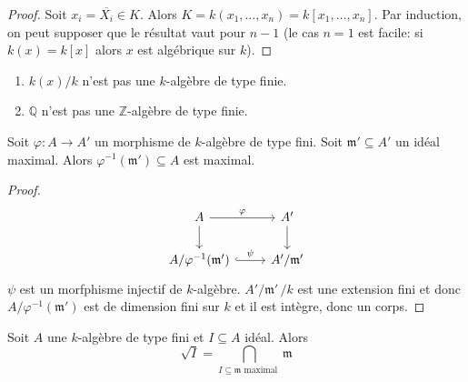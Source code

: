 \begin{proof}{}
    Soit \(x_{i} = \overline{X_{i}} \in K\). Alors \(K = k{(x_{1}, \dots,
    x_{n})} = k[x_{1}, \dots, x_{n}]\). Par induction, on peut supposer que le
    résultat vaut pour \(n-1\) (le cas \(n=1\) est facile: si \(k{(x)} = k[x]\)
    alors \(x\) est algébrique sur \(k\)). %
\end{proof}

\begin{eser}{}
\begin{enumerate}[label = \arabic*.]
    \item \(k{(x)} / k\) n'est pas une \(k\)-algèbre de type finie.
    \item \(\mathbb{Q}\) n'est pas une \(\mathbb{Z}\)-algèbre de type finie.
\end{enumerate}
\end{eser}

\begin{corollary}{}\label{cor:premax}
    Soit \(\varphi : A \to A'\) un morphisme de \(k\)-algèbre de type fini. Soit
    \(\mathfrak{m}' \subseteq A' \) un idéal maximal. Alors \(\varphi
    ^{-1}{(\mathfrak{m}')} \subseteq A \) est maximal.
    
\end{corollary}
\begin{proof}{}
\[
\begin{tikzcd}
	A & A' \\
	A / \varphi ^{-1}{(\mathfrak{m}')} & A' / \mathfrak{m}'
	\arrow["\varphi", from=1-1, to=1-2]
	\arrow[from=1-1, to=2-1]
	\arrow[from=1-2, to=2-2]
	\arrow["\psi", hook, from=2-1, to=2-2]
\end{tikzcd}
\] 
\(\psi \) est un morfphisme injectif de \(k\)-algèbre. \(A'/\mathfrak{m}' \,/ k\) est
une extension fini et donc \(A / \varphi ^{-1}{(\mathfrak{m}')}\) est de
dimension fini sur \(k\) et il est intègre, donc un corps.
\end{proof}

\begin{proposition}{}
    Soit \(A\) une \(k\)-algèbre de type fini et \(I \subseteq A \) idéal. Alors
    \[\sqrt{I} = \bigcap_{I \subseteq \mathfrak{m} \text{ maximal }} \mathfrak{m}\]
\end{proposition}


